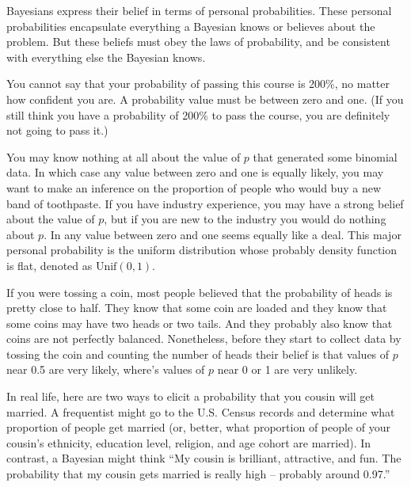 \documentclass[]{book}
\theoremstyle{definition}
\theoremstyle{definition}
\theoremstyle{definition}
\theoremstyle{remark}
\let\BeginKnitrBlock\begin \let\EndKnitrBlock\end
\begin{document}
Bayesians express their belief in terms of personal probabilities. These
personal probabilities encapsulate everything a Bayesian knows or
believes about the problem. But these beliefs must obey the laws of
probability, and be consistent with everything else the Bayesian knows.

\BeginKnitrBlock{example}
\protect\hypertarget{exm:200percent}{}{\label{exm:200percent} }You cannot
say that your probability of passing this course is 200\%, no matter how
confident you are. A probability value must be between zero and one. (If
you still think you have a probability of 200\% to pass the course, you
are definitely not going to pass it.)
\EndKnitrBlock{example}

\BeginKnitrBlock{example}
\protect\hypertarget{exm:binomial-data}{}{\label{exm:binomial-data} }You may
know nothing at all about the value of \(p\) that generated some
binomial data. In which case any value between zero and one is equally
likely, you may want to make an inference on the proportion of people
who would buy a new band of toothpaste. If you have industry experience,
you may have a strong belief about the value of \(p\), but if you are
new to the industry you would do nothing about \(p\). In any value
between zero and one seems equally like a deal. This major personal
probability is the uniform distribution whose probably density function
is flat, denoted as \(\text{Unif}(0,1)\).
\EndKnitrBlock{example}

\BeginKnitrBlock{example}
\protect\hypertarget{exm:coin-toss}{}{\label{exm:coin-toss} }If you were
tossing a coin, most people believed that the probability of heads is
pretty close to half. They know that some coin are loaded and they know
that some coins may have two heads or two tails. And they probably also
know that coins are not perfectly balanced. Nonetheless, before they
start to collect data by tossing the coin and counting the number of
heads their belief is that values of \(p\) near 0.5 are very likely,
where's values of \(p\) near 0 or 1 are very unlikely.
\EndKnitrBlock{example}

\BeginKnitrBlock{example}
\protect\hypertarget{exm:marriage}{}{\label{exm:marriage} }In real life,
here are two ways to elicit a probability that you cousin will get
married. A frequentist might go to the U.S. Census records and determine
what proportion of people get married (or, better, what proportion of
people of your cousin's ethnicity, education level, religion, and age
cohort are married). In contrast, a Bayesian might think ``My cousin is
brilliant, attractive, and fun. The probability that my cousin gets
married is really high -- probably around 0.97.''
\EndKnitrBlock{example}
\end{document}
